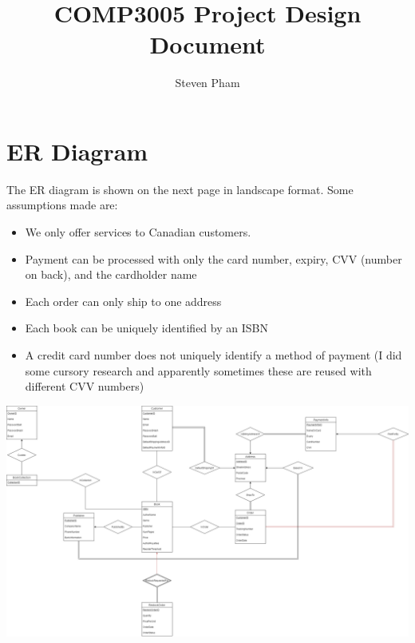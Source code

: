 \documentclass{article}
\title{COMP3005 Project Design Document}
\author{Steven Pham}
\begin{document}
\maketitle
\section{ER Diagram}
The ER diagram is shown on the next page in landscape format.
Some assumptions made are:
\begin{itemize}
  \item We only offer services to Canadian customers.
  \item Payment can be processed with only the card number, expiry, CVV (number on back), and the cardholder name
  \item Each order can only ship to one address
  \item Each book can be uniquely identified by an ISBN
  \item A credit card number does not uniquely identify a method of payment (I did some cursory research and apparently sometimes these are reused with different CVV numbers)
\end{itemize}

\begin{landscape}
\includegraphics[height=\textwidth]{er}
\end{landscape}
\end{document}
